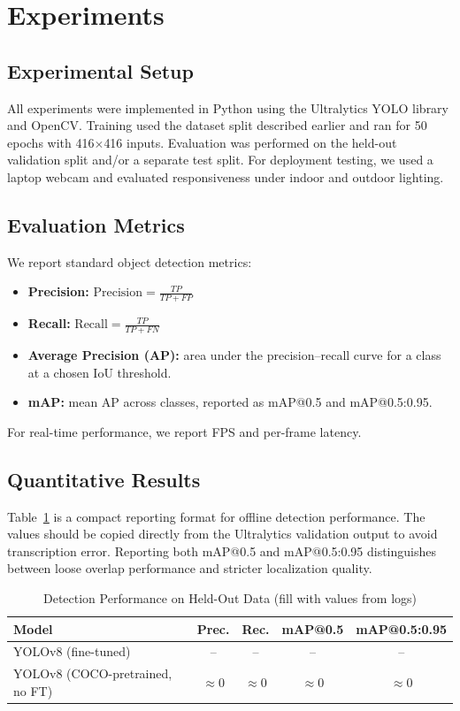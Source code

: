 \documentclass[conference]{IEEEtran}
\begin{document}
\section{Experiments}

\subsection{Experimental Setup}
All experiments were implemented in Python using the Ultralytics YOLO library and OpenCV. Training used the dataset split described earlier and ran for 50 epochs with 416$\times$416 inputs. Evaluation was performed on the held-out validation split and/or a separate test split. For deployment testing, we used a laptop webcam and evaluated responsiveness under indoor and outdoor lighting.

\subsection{Evaluation Metrics}
We report standard object detection metrics:
\begin{itemize}
    \item \textbf{Precision:} $\mathrm{Precision} = \frac{TP}{TP + FP}$
    \item \textbf{Recall:} $\mathrm{Recall} = \frac{TP}{TP + FN}$
    \item \textbf{Average Precision (AP):} area under the precision--recall curve for a class at a chosen IoU threshold.
    \item \textbf{mAP:} mean AP across classes, reported as mAP@0.5 and mAP@0.5:0.95.
\end{itemize}
For real-time performance, we report FPS and per-frame latency.

\subsection{Quantitative Results}
Table~\ref{tab:results} is a compact reporting format for offline detection performance. The values should be copied directly from the Ultralytics validation output to avoid transcription error. Reporting both mAP@0.5 and mAP@0.5:0.95 distinguishes between loose overlap performance and stricter localization quality.
\begin{table}[H]
\centering
\caption{Detection Performance on Held-Out Data (fill with values from logs)}
\label{tab:results}
\begin{tabular}{lcccc}
\toprule
\textbf{Model} & \textbf{Prec.} & \textbf{Rec.} & \textbf{mAP@0.5} & \textbf{mAP@0.5:0.95} \\
\midrule
YOLOv8 (fine-tuned) & -- & -- & -- & -- \\
YOLOv8 (COCO-pretrained, no FT) & $\approx$0 & $\approx$0 & $\approx$0 & $\approx$0 \\
\bottomrule
\end{tabular}
\end{table}
\end{document}
